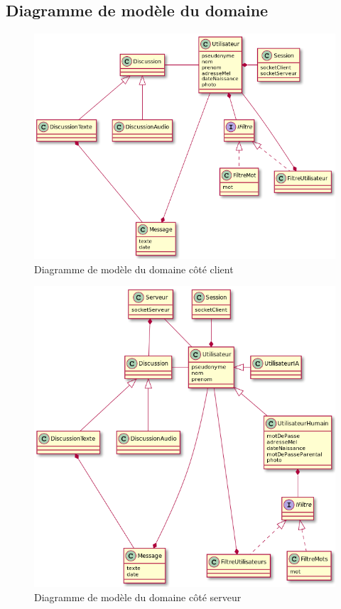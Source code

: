 \documentclass[a4paper,12pt]{article}
\begin{document}
	\subsection{Diagramme de modèle du domaine}
	\begin{figure}[H]
		\centerline{\includegraphics[width=16.5cm]{../diagrammes/img/modeleDomaineClient.png}}
		\caption{Diagramme de modèle du domaine côté client}
	\end{figure}

	\begin{figure}[H]
		\centerline{\includegraphics[width=16.5cm]{../diagrammes/img/modeleDomaineServeur.png}}
		\caption{Diagramme de modèle du domaine côté serveur}
	\end{figure}
\end{document}
